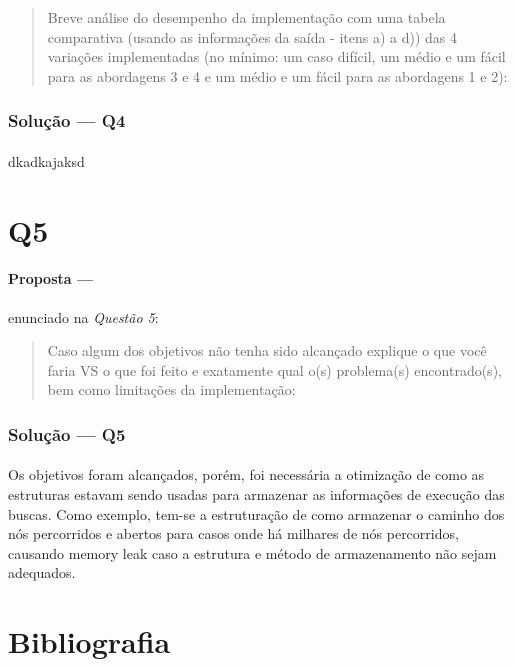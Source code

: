 \documentclass[12pt]{article}
\begin{document}
\begin{quote}
Breve análise do desempenho da implementação com uma tabela comparativa (usando as informações da saída - itens a) a d)) das 4 variações implementadas (no mínimo: um caso difícil, um médio e um fácil para as abordagens 3 e 4 e um médio e um fácil para as abordagens 1 e 2):
\end{quote}

\subsubsection{Solução --- \textbf{Q4}}

\paragraph{}
dkadkajaksd

\section{Q5}

\paragraph{Proposta ---} enunciado na \textit{Questão 5}:

\begin{quote}
Caso algum dos objetivos não tenha sido alcançado explique o que você faria VS o que foi feito e exatamente qual o(s)
  problema(s) encontrado(s), bem como  limitações da implementação:
\end{quote}

\subsubsection{Solução --- \textbf{Q5}}

\paragraph{}
Os objetivos foram alcançados, porém, foi necessária a otimização de como as estruturas estavam sendo usadas para armazenar as informações de execução das buscas. Como exemplo, tem-se a estruturação de como armazenar o caminho dos nós percorridos e abertos para casos onde há milhares de nós percorridos, causando memory leak caso a estrutura e método de armazenamento não sejam adequados.

\newpage
\section{Bibliografia}


\end{document}
